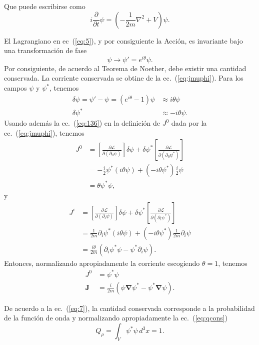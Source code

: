 Que puede escribirse como
\begin{equation}
  \label{eq:133}
  i\frac{\partial}{\partial t}\psi=
  \left(
    -\frac{1}{2m}\nabla^2+V
  \right)\psi.
\end{equation}

El Lagrangiano en ec~(\ref{eq:5}), y por consiguiente la Acci\'on, es invariante bajo una transformaci\'on de fase
\begin{equation}
  \label{eq:6}
  \psi\to\psi'=e^{i\theta}\psi.
\end{equation}
Por consiguiente, de acuerdo al Teorema de Noether, debe existir una cantidad conservada. La corriente conservada se obtine de la ec.~(\ref{eq:jmuphi}). Para los campos $\psi$ y $\psi^*$, tenemos
\begin{align}
  \delta\psi=\psi'-\psi=(e^{i\theta}-1)\psi&\approx i\theta\psi\\
  \delta\psi^*&\approx-i\theta\psi.
\end{align}
Usando adem\'as la ec.~(\ref{eq:136}) en la definici\'on de $J^0$ dada por la ec.~(\ref{eq:jmuphi}), tenemos
\begin{align}
  \label{eq:135}
  J^0&=\left[\frac{\partial\mathcal{L}}{\partial(\partial_0\psi)}\right]\delta\psi
  +\delta\psi^*\left[\frac{\partial\mathcal{L}}{\partial(\partial_0\psi^*)}\right]\nonumber\\
  &=-\frac{i}{2}\psi^*(i\theta\psi)+(-i\theta\psi^*)\frac{i}{2}\psi\nonumber\\
  &=\theta\psi^*\psi,
\end{align}
y
\begin{align}
  \label{eq:134}
  J^i&=\left[\frac{\partial\mathcal{L}}{\partial(\partial_i\psi)}\right]\delta\psi
  +\delta\psi^*\left[\frac{\partial\mathcal{L}}{\partial(\partial_i\psi^*)}\right]\nonumber\\
  &=\frac{1}{2m}\partial_i\psi^*(i\theta\psi)+(-i\theta\psi^*)\frac{1}{2m}\partial_i\psi\nonumber\\
  &=\frac{i\theta}{2m}\left(\partial_i\psi^*\psi-\psi^*\partial_i\psi \right).
\end{align}
Entonces, normalizando apropiadamente la corriente escogiendo $\theta=1$, tenemos
\begin{align}
  \label{eq:7}
  J^0&=\psi^*\psi\\
  \mathbf{J}&=\frac{i}{2m}
  \left(
    \psi\boldsymbol{\nabla}\psi^*-\psi^*\boldsymbol{\nabla}\psi
  \right).
\end{align}
\begin{frame}
De acuerdo a la ec.~(\ref{eq:7}), la cantidad conservada corresponde a la probabilidad de la funci\'on de onda y normalizando apropiadamente la ec.~(\ref{eq:qcons})
\begin{equation}
  \label{eq:57}
Q_\rho=  \int_V \psi^*\psi \,d^3x=1.
\end{equation}
\end{frame}

